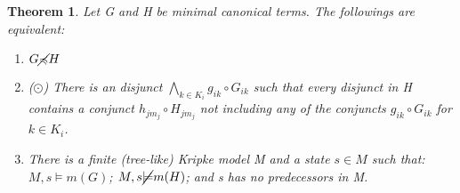 \documentclass[10pt]{article}
\newcommand{\cle}{\preccurlyeq}
\newtheorem{theorem}{Theorem}
\begin{document}
		\begin{theorem}\label{th24}
			Let G and H be minimal canonical terms. The followings are equivalent:
			\begin{enumerate}
				\item  $G \cancel{\cle}H$
				\item ($\odot$) There is an disjunct $\bigwedge_{k \in K_i} g_{ik}\circ G_{ik}$ such that every disjunct in H contains a conjunct $h_{jm_j} \circ H_{jm_j}$ not including any of the conjuncts $g_{ik} \circ G_{ik}$ for $k\in K_i$.
				\item There is a finite (tree-like) Kripke model M and a state $s\in M$ such that: $M,s \models m(G)$; $M,s \cancel{\models}m(H)$; and s has no predecessors in M.
			\end{enumerate}
		\end{theorem}
\end{document}

